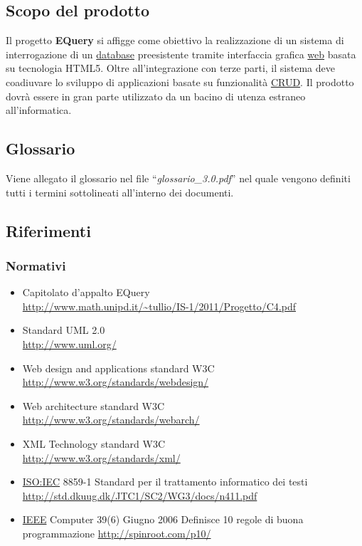 \documentclass[a4paper,11pt]{article}
\begin{document}
\subsection{Scopo del prodotto}
Il progetto \textbf{EQuery} si affigge come obiettivo la realizzazione di un sistema di interrogazione di un \underline{database} preesistente tramite interfaccia grafica \underline{web} basata su tecnologia HTML5. Oltre all'integrazione con terze parti, il sistema deve coadiuvare lo sviluppo di applicazioni basate su funzionalit\`a \underline{CRUD}. Il prodotto dovr\`a essere in gran parte utilizzato da un bacino di utenza estraneo all'informatica.
\subsection{Glossario}
Viene allegato il glossario nel file ``\textit{glossario\_3.0.pdf}'' nel quale vengono definiti tutti i termini sottolineati all'interno dei documenti.
\subsection{Riferimenti}
\subsubsection{Normativi}
\begin{itemize}
\item Capitolato d'appalto EQuery\\
\url{http://www.math.unipd.it/~tullio/IS-1/2011/Progetto/C4.pdf}
\item Standard UML 2.0\\
\url{http://www.uml.org/}
\item Web design and applications standard W3C\\
\url{http://www.w3.org/standards/webdesign/}
\item Web architecture standard W3C\\
\url{http://www.w3.org/standards/webarch/}
\item XML Technology standard W3C\\
\url{http://www.w3.org/standards/xml/}
\item \underline{ISO:IEC} 8859-1 Standard per il trattamento informatico dei testi\\
\url{http://std.dkuug.dk/JTC1/SC2/WG3/docs/n411.pdf}
\item \underline{IEEE} Computer 39(6) Giugno 2006 Definisce 10 regole di buona programmazione
\url{http://spinroot.com/p10/}
\end{itemize}
\end{document}
